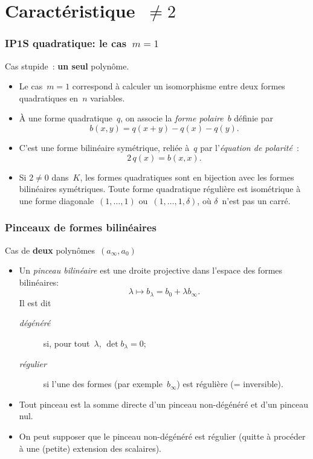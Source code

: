 \documentclass{beamer}%
\def\strong#1{{\bf\color{rouge}#1}}
\def\emphz#1{\emph{{\color{bleu}#1}}}
\begin{document}
\section{Caractéristique~$≠2$}
\begin{frame}\frametitle{IP1S quadratique: le cas~$m = 1$}%
Cas stupide : \strong{un seul} polynôme.

\begin{itemize}
\item Le cas~$m = 1$ correspond à calculer un isomorphisme entre deux
formes quadratiques en~$n$ variables.
\item À une forme quadratique~$q$, on associe la \emphz{forme
polaire}~$b$ définie par
\begin{equation*}
b(x,y) = q(x+y) - q(x) - q(y).
\end{equation*}
\item C'est une forme bilinéaire symétrique, reliée à~$q$ par
l'\emphz{équation de polarité} :
\begin{equation*}
2\,q(x) = b(x,x).
\end{equation*}
\item Si $2 ≠ 0$ dans~$K$, les formes quadratiques sont en bijection avec
les formes bilinéaires symétriques. Toute forme quadratique régulière est
isométrique à une forme diagonale~$(1,…,1)$ ou~$(1,…,1, δ)$, où $δ$~n'est
pas un carré.
\end{itemize}
\end{frame}%
\begin{frame}\frametitle{Pinceaux de formes bilinéaires}%
Cas de \strong{deux} polynômes~$(a_{∞}, a_{0})$
\begin{itemize}
\item Un \emphz{pinceau bilinéaire} est une droite projective dans
l'espace des formes bilinéaires:
\begin{equation}
λ ↦ b_{λ} = b_{0} + λ b_{∞}.
\end{equation}
Il est dit
\begin{description}
\item[\emphz{dégénéré}] si, pour tout~$λ$, $\det b_{λ} = 0$;
\item[\emphz{régulier}] si l'une des formes (par exemple~$b_{∞}$) est
régulière (= inversible).
\end{description}
\item Tout pinceau est la somme directe d'un pinceau non-dégénéré et d'un
pinceau nul.
\item On peut supposer que le pinceau non-dégénéré est régulier (quitte à
procéder à une (petite) extension des scalaires).
\end{itemize}
\end{frame}%
\end{document}
